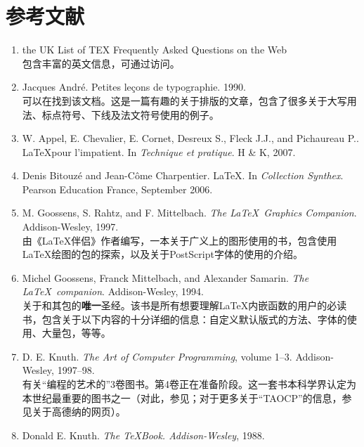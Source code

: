 \chapter*{参考文献}

\begin{enumerate}
    \renewcommand{\labelenumi}{[\theenumi]}
    \item the UK List of TEX Frequently Asked Questions on the Web\\
    包含丰富的英文信息，可通过访问。
    \item Jacques André. Petites leçons de typographie. 1990.\\
    可以在找到该文档。这是一篇有趣的关于排版的文章，包含了很多关于大写用法、标点符号、下线及法文符号使用的例子。
    \item W. Appel, E. Chevalier, E. Cornet, Desreux S., Fleck J.J., and Pichaureau P.. \LaTeX pour l'impatient. In \emph{Technique et pratique}. H \& K, 2007.
    \item Denis Bitouzé and Jean-Côme Charpentier. \LaTeX . In \emph{Collection Synthex}. Pearson Education France, September 2006.
    \item M. Goossens, S. Rahtz, and F. Mittelbach. \emph{The \LaTeX \ Graphics Companion}. Addison-Wesley, 1997.\\
    由《\LaTeX 伴侣》作者编写，一本关于广义上的图形使用的书，包含使用\LaTeX 绘图的包的探索，以及关于PostScript字体的使用的介绍。
    \item Michel Goossens, Franck Mittelbach, and Alexander Samarin. \emph{The \LaTeX \ companion}. \linebreak Addison-Wesley, 1994.\\
    关于\LaTeXe 和其包的\textbf{唯一}圣经。该书是所有想要理解\LaTeX 内嵌函数的用户的必读书，包含关于以下内容的十分详细的信息：自定义默认版式的方法、字体的使用、大量包，等等。
    \item D. E. Knuth. \emph{The Art of Computer Programming}, volume 1–3. Addison-Wesley, 1997–98.\\
    有关``编程的艺术的''3卷图书。第4卷正在准备阶段。这一套书本科学界认定为本世纪最重要的图书之一（对此，参见；对于更多关于``TAOCP''的信息，参见关于高德纳的网页）。
    \item Donald E. Knuth. \emph{The \TeX Book. Addison-Wesley}, 1988.\\

\end{enumerate}
